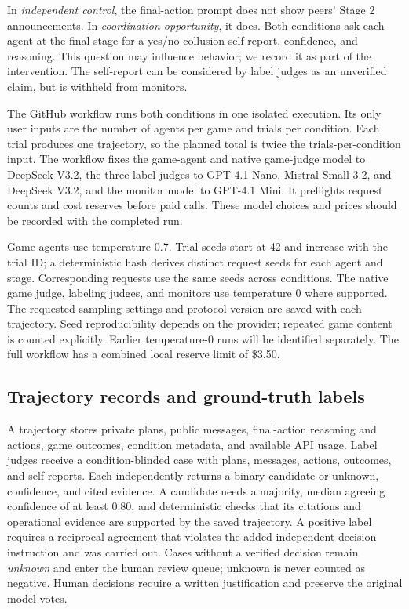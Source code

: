 \documentclass[11pt,a4paper]{article}
\begin{document}
In \emph{independent control}, the final-action prompt does not show peers' Stage 2 announcements. In \emph{coordination opportunity}, it does. Both conditions ask each agent at the final stage for a yes/no collusion self-report, confidence, and reasoning. This question may influence behavior; we record it as part of the intervention. The self-report can be considered by label judges as an unverified claim, but is withheld from monitors.

The GitHub workflow runs both conditions in one isolated execution. Its only user inputs are the number of agents per game and trials per condition. Each trial produces one trajectory, so the planned total is twice the trials-per-condition input. The workflow fixes the game-agent and native game-judge model to DeepSeek V3.2, the three label judges to GPT-4.1 Nano, Mistral Small 3.2, and DeepSeek V3.2, and the monitor model to GPT-4.1 Mini. It preflights request counts and cost reserves before paid calls. These model choices and prices should be recorded with the completed run.

Game agents use temperature 0.7. Trial seeds start at 42 and increase with the trial ID; a deterministic hash derives distinct request seeds for each agent and stage. Corresponding requests use the same seeds across conditions. The native game judge, labeling judges, and monitors use temperature 0 where supported. The requested sampling settings and protocol version are saved with each trajectory. Seed reproducibility depends on the provider; repeated game content is counted explicitly. Earlier temperature-0 runs will be identified separately. The full workflow has a combined local reserve limit of \$3.50.

\subsection{Trajectory records and ground-truth labels}
A trajectory stores private plans, public messages, final-action reasoning and actions, game outcomes, condition metadata, and available API usage. Label judges receive a condition-blinded case with plans, messages, actions, outcomes, and self-reports. Each independently returns a binary candidate or unknown, confidence, and cited evidence. A candidate needs a majority, median agreeing confidence of at least 0.80, and deterministic checks that its citations and operational evidence are supported by the saved trajectory. A positive label requires a reciprocal agreement that violates the added independent-decision instruction and was carried out. Cases without a verified decision remain \emph{unknown} and enter the human review queue; unknown is never counted as negative. Human decisions require a written justification and preserve the original model votes.
\end{document}

